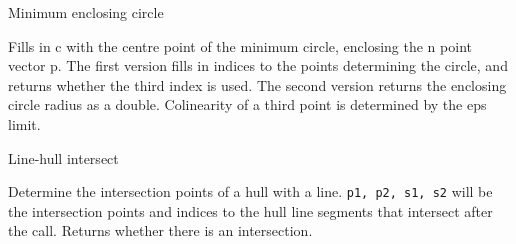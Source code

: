 \begin{algorithm}{Minimum enclosing circle}

\desc
Fills in c with the centre point of the minimum circle, enclosing the
n point vector p. The first version fills in indices to the points
determining the circle, and returns whether the third index is used.
The second version returns the enclosing circle radius as a double.
Colinearity of a third point is determined by the eps limit.
\end{algorithm}


\begin{algorithm}{Line-hull intersect}

\desc
Determine the intersection points of a hull with a line.
{\tt p1, p2, s1, s2} will be the intersection points and indices to the hull
line segments that intersect after the call. Returns whether there is an
intersection.
\end{algorithm}

